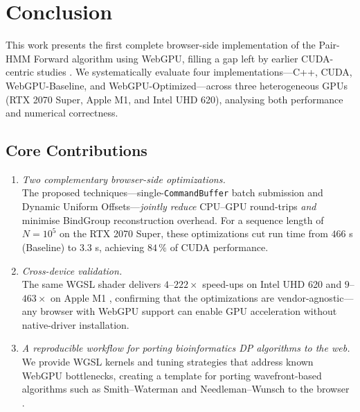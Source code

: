 \documentclass[PhD]{PHlab-thesis}
\begin{document}
\chapter{Conclusion}

This work presents the first complete browser-side implementation of the Pair-HMM Forward algorithm using WebGPU, filling a gap left by earlier CUDA-centric studies \cite{Banerjee2017,Schmidt2024-gpuPairHMM}.  
We systematically evaluate four implementations—C++, CUDA, WebGPU-Baseline, and WebGPU-Optimized—across three heterogeneous GPUs (RTX 2070 Super, Apple M1, and Intel UHD 620), analysing both performance and numerical correctness.

\section{Core Contributions}

\begin{enumerate}
  \item \emph{Two complementary browser-side optimizations.}\\
        The proposed techniques—single-\texttt{CommandBuffer} batch submission and Dynamic Uniform Offsets—\emph{jointly reduce} CPU–GPU round-trips \emph{and} minimise BindGroup reconstruction overhead.  
        For a sequence length of $N = 10^{5}$ on the RTX 2070 Super, these optimizations cut run time from $466$ s (Baseline) to $3.3$ s, achieving $84\,\%$ of CUDA performance.

  \item \emph{Cross-device validation.}\\
        The same WGSL shader delivers $4$–$222\times$ speed-ups on Intel UHD 620 \cite{Intel2018-uhd620} and $9$–$463\times$ on Apple M1 \cite{Apple2020-m1}, confirming that the optimizations are vendor-agnostic—any browser with WebGPU support can enable GPU acceleration without native-driver installation.

  \item \emph{A reproducible workflow for porting bioinformatics DP algorithms to the web.}\\
        We provide WGSL kernels and tuning strategies that address known WebGPU bottlenecks, creating a template for porting wavefront-based algorithms such as Smith–Waterman and Needleman–Wunsch to the browser \cite{Ghosh2018}.
\end{enumerate}

\end{document}
